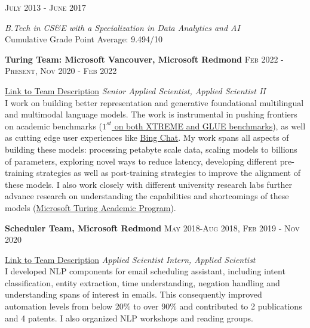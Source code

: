 \documentclass[8pt,a4paper]{article}
\begin{document}
  {\textsc{July 2013 - June 2017}} {%
  
    {
    \emph{B.Tech in CS\&E with a Specialization in Data Analytics and AI} \\
    Cumulative Grade Point Average: 9.494/10
    }
    
}
\spacedhrule{0.6em}{-0.4em}  %
\headedsection
  {\textbf{Turing Team: Microsoft Vancouver, Microsoft Redmond}}
  {\textsc{Feb 2022 - Present, Nov 2020 - Feb 2022}} {%
  
    {
    \href{https://turing.microsoft.com}{Link to Team Description}  \hfill \textit{Senior Applied Scientist, Applied Scientist II}  \\
    I work on building better representation and generative foundational multilingual and multimodal language models. The work is instrumental in pushing frontiers on academic benchmarks (\href{https://blogs.bing.com/search-quality-insights/october-2022/Microsoft-Turing-Universal-Language-Representation-model,-T-ULRv6,-tops-both-XTREME-and-GLUE-leaderb}{$1^{st}$ on both XTREME and GLUE benchmarks}), as well as cutting edge user experiences like \href{https://blogs.microsoft.com/blog/2023/02/07/reinventing-search-with-a-new-ai-powered-microsoft-bing-and-edge-your-copilot-for-the-web/}{Bing Chat}. My work spans all aspects of building these models: processing petabyte scale data, scaling models to billions of parameters, exploring novel ways to reduce latency, developing different pre-training strategies as well as post-training strategies to improve the alignment of these models. I also work closely with different university research labs further advance research on understanding the capabilities and shortcomings of these models (\href{https://www.microsoft.com/en-us/research/collaboration/microsoft-turing-academic-program/}{Microsoft Turing Academic Program}).
    
    }
}
\headedsection
  {\textbf{Scheduler Team, Microsoft Redmond}}
  {\textsc{May 2018-Aug 2018, Feb 2019 - Nov 2020}} {%

    {
      \href{https://www.microsoft.com/en-us/research/project/scheduler/}{Link to Team Description} \hfill \textit{Applied Scientist Intern, Applied Scientist} \\
      I developed NLP components for email scheduling assistant, including intent classification, entity extraction, time understanding, negation handling and understanding spans of interest in emails. This consequently improved automation levels from below 20\% to over 90\% and contributed to 2 publications and 4 patents. I also organized NLP workshops and reading groups.
    }
}
\end{document}

